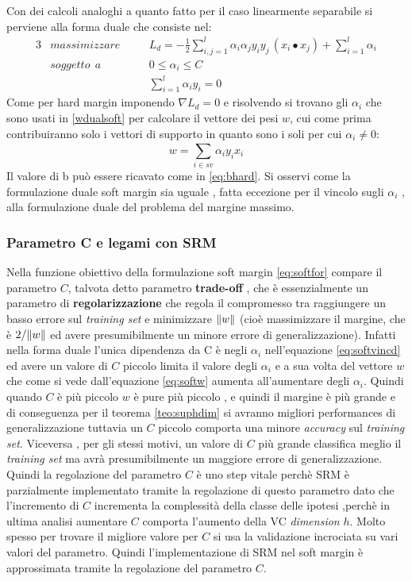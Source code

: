 Con dei calcoli analoghi a quanto fatto per il caso linearmente separabile si perviene alla forma duale che consiste nel:
\begin{alignat}{3}
\label{eq:softford}
&massimizzare \quad&&L_{d} = - \frac{1}{2} \sum_{i,j = 1}^{l}\alpha_{i}\alpha_{j}y_{i}y_{j}\,(x_{i} \bullet x_{j}) + \sum_{i=1}^{l}\alpha_{i} \\
\label{eq:softvincd}
&soggetto \:\:a &&0 \leq \alpha_i \leq C \qquad \qquad \\
\label{eq:softvind2}
&\:&&\sum_{i=1}^{l} \alpha_i y_i = 0 
\end{alignat}
Come per hard margin imponendo $\nabla L_d = 0$ e risolvendo si trovano gli $\alpha_i$ che sono usati in \ref{wdualsoft} per calcolare il vettore dei pesi $w$, cui come prima contribuiranno solo i vettori di supporto in quanto sono i soli per cui $\alpha_i \neq 0$:
\begin{equation}
\label{eq:softw}
w = \sum_{i \in sv}^{}\alpha_iy_ix_i
\end{equation}
Il valore di b può essere ricavato come in \eqref{eq:bhard}.
Si osservi come la formulazione duale soft margin sia uguale , fatta eccezione per il vincolo sugli $\alpha_i$ , alla formulazione duale del problema del margine massimo. 

\subsubsection{Parametro C e legami con SRM}
\label{subsub:srmsoft}
Nella funzione obiettivo della formulazione soft margin \eqref{eq:softfor} compare il parametro $C$, talvota detto parametro \textbf{trade-off} , che è essenzialmente un parametro di \textbf{regolarizzazione} che regola il compromesso tra raggiungere un basso errore sul \textit{training set} e minimizzare $\lVert w\rVert$ (cioè massimizzare il margine, che è $2/\lVert w\rVert$ ed avere presumibilmente un minore errore di generalizzazione). Infatti nella forma duale l'unica dipendenza da C è negli $\alpha_i$ nell'equazione \eqref{eq:softvincd} ed avere un valore di $C$ piccolo limita il valore degli $\alpha_i$ e a sua volta del vettore $w$ che come si vede dall'equazione \eqref{eq:softw} aumenta all'aumentare degli $\alpha_i$. Quindi quando $C$ è più piccolo $w$ è pure più piccolo , e quindi il margine è più grande e di conseguenza per il teorema \ref{teo:suphdim} si avranno migliori performances di generalizzazione tuttavia un $C$ piccolo  comporta una minore \textit{accuracy} sul \textit{training set}. Viceversa , per gli stessi motivi, un valore di $C$ più grande classifica meglio il \textit{training set} ma avrà presumibilmente un maggiore errore di generalizzazione. Quindi la regolazione del parametro $C$ è uno step vitale perchè \ac{SRM} è parzialmente implementato tramite la regolazione di questo parametro dato che l'incremento di $C$ incrementa la complessità della classe delle ipotesi ,perchè in ultima analisi aumentare $C$ comporta l'aumento della \ac{VC} \textit{dimension} $h$. Molto spesso per trovare il migliore valore per $C$ si usa la validazione incrociata su vari valori del parametro. Quindi l'implementazione di \ac{SRM} nel soft margin è approssimata tramite la regolazione del parametro $C$.

